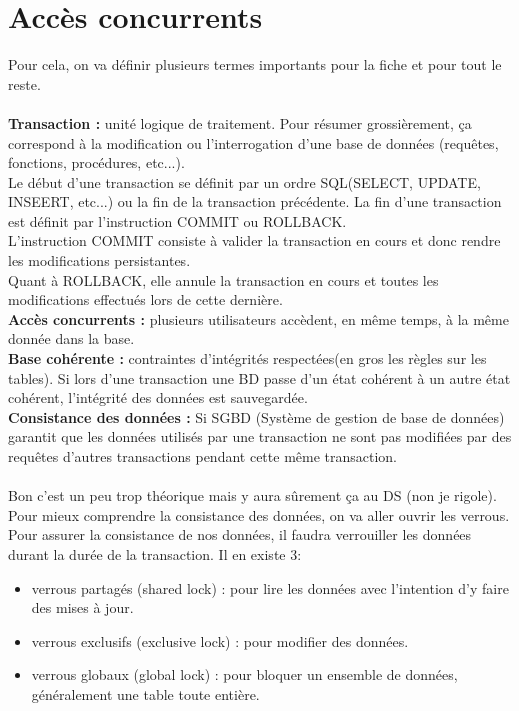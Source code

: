 \documentclass{report}
\begin{document}
\section{Accès concurrents}
Pour cela, on va définir plusieurs termes importants pour la fiche et pour tout le reste.\\\\
\textbf{Transaction :} unité logique de traitement. Pour résumer grossièrement, ça correspond à la modification ou l'interrogation d'une base de données (requêtes, fonctions, procédures, etc...).\\
Le début d'une transaction se définit par un ordre SQL(SELECT, UPDATE, INSEERT, etc...) ou la fin de la transaction précédente. La fin d'une transaction est définit par l'instruction COMMIT ou ROLLBACK.\\
L'instruction COMMIT consiste à valider la transaction en cours et donc rendre les modifications persistantes.\\
Quant à ROLLBACK, elle annule la transaction en cours et toutes les modifications effectués lors de cette dernière.\\
\noindent\textbf{Accès concurrents :} plusieurs utilisateurs accèdent, en même temps, à la même donnée dans la base.\\
\noindent\textbf{Base cohérente :} contraintes d'intégrités respectées(en gros les règles sur les tables). Si lors d'une transaction une BD passe d'un état cohérent à un autre état cohérent, l'intégrité des données est sauvegardée.\\
\noindent\textbf{Consistance des données :} Si SGBD (Système de gestion de base de données) garantit que les données utilisés par une transaction ne sont pas modifiées par des requêtes d'autres transactions pendant cette même transaction.\\\\
Bon c'est un peu trop théorique mais y aura sûrement ça au DS (non je rigole). Pour mieux comprendre la consistance des données, on va aller ouvrir les verrous.\\
Pour assurer la consistance de nos données, il faudra verrouiller les données durant la durée de la transaction. Il en existe 3:
\begin{itemize}
\item verrous partagés (shared lock) : pour lire les données avec l'intention d'y faire des mises à jour.
\item verrous exclusifs (exclusive lock) : pour modifier des données.
\item verrous globaux (global lock) : pour bloquer un ensemble de données, généralement une table toute entière.
\end{itemize}
\end{document}
